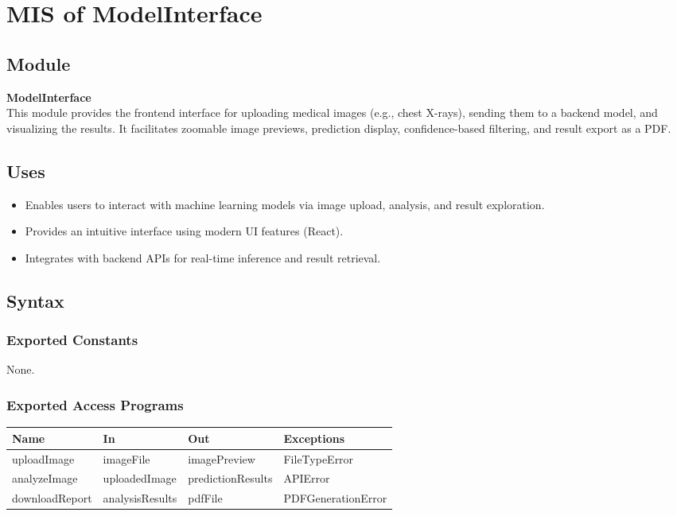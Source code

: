 \documentclass[12pt, titlepage]{article}
\begin{document}
\section{MIS of ModelInterface}

\subsection{Module}
\textbf{ModelInterface} \\
This module provides the frontend interface for uploading medical images (e.g., chest X-rays), sending them to a backend model, and visualizing the results. It facilitates zoomable image previews, prediction display, confidence-based filtering, and result export as a PDF.

\subsection{Uses}
\begin{itemize}
    \item Enables users to interact with machine learning models via image upload, analysis, and result exploration.
    \item Provides an intuitive interface using modern UI features (React).
    \item Integrates with backend APIs for real-time inference and result retrieval.
\end{itemize}

\subsection{Syntax}

\subsubsection{Exported Constants}
None.

\subsubsection{Exported Access Programs}

\begin{center}
  \begin{tabular}{|p{4cm}|p{4cm}|p{4cm}|p{4cm}|}
    \hline
    \textbf{Name} & \textbf{In} & \textbf{Out} & \textbf{Exceptions} \\
    \hline
    uploadImage & imageFile & imagePreview & FileTypeError \\
    \hline
    analyzeImage & uploadedImage & predictionResults & APIError \\
    \hline
    downloadReport & analysisResults & pdfFile & PDFGenerationError \\
    \hline
  \end{tabular}
\end{center}
\end{document}

